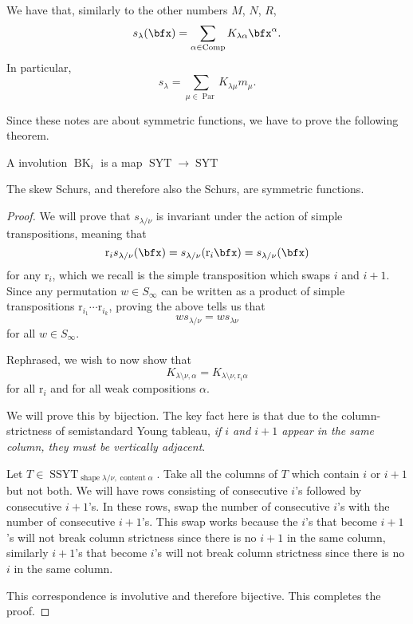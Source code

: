 \documentclass{article}
\DeclareMathOperator{\shape}{shape}
\DeclareMathOperator{\content}{content}
\DeclareMathOperator{\Par}{Par}
\DeclareMathOperator{\Com}{Comp}
\DeclareMathOperator{\SYT}{SYT}
\DeclareMathOperator{\SSYT}{SSYT}
\newcommand*\refl{\ensuremath{\text{r}}}
\DeclareMathOperator{\BK}{BK}
\begin{document}
\begin{remark}
    We have that, similarly to the other numbers $M$, $N$, $R$,
    \[
        s_\lambda(\bfx)
        = 
        \sum_{\alpha\in\Com} K_{\lambda\alpha}\bfx^\alpha.
    \]
    In particular,
    \[
        s_\lambda
        = 
        \sum_{\mu\in\Par} 
        K_{\lambda\mu}m_\mu.
    \]
\end{remark}

Since these notes are about symmetric functions, we have to prove the following theorem.

\begin{definition}
    A  involution $\BK_i$ is a map $\SYT \to \SYT$ 
\end{definition}

\begin{theorem} The skew Schurs, and therefore also the Schurs, are symmetric functions.
\end{theorem}

\begin{proof}
    We will prove that $s_{\lambda/\nu}$ is invariant under the action of simple transpositions, meaning that
    \[
        \refl_i s_{\lambda/\nu} (\bfx)
        = 
        s_{\lambda/\nu} (\refl_i \bfx)
        =
        s_{\lambda/\nu} (\bfx)
    \]
    for any $\refl_i$, which we recall is the simple transposition which swaps $i$ and $i+1$.
    Since any permutation $w \in S_\infty$ can be written as a product of simple transpositions $\refl_{i_1}\cdots \refl_{i_k}$, proving the above tells us that 
    \[
        ws_{\lambda/\nu} 
        = 
        ws_{\lambda\nu}
    \]
    for all $w \in S_\infty$.

    Rephrased, we wish to now show that 
    \[
        K_{\lambda\setminus\nu,\alpha} 
        = 
        K_{\lambda\setminus\nu,\refl_i\alpha}
    \]
    for all $\refl_i$ and for all weak compositions $\alpha$.

    We will prove this by bijection.
    The key fact here is that due to the column-strictness of semistandard Young tableau, \textit{if $i$ and $i+1$ appear in the same column, they must be vertically adjacent}. 

    Let $T\in\SSYT_{\shape \lambda/\nu,\content \alpha}$. 
    Take all the columns of $T$ which contain $i$ or $i+1$ but not both. 
    We will have rows consisting of consecutive $i$'s followed by consecutive $i+1$'s. 
    In these rows, swap the number of consecutive $i$'s with the number of consecutive $i+1$'s. 
    This swap works because the $i$'s that become $i+1$'s will not break column strictness since there is no $i+1$ in the same column, similarly $i+1$'s that become $i$'s will not break column strictness since there is no $i$ in the same column.

    This correspondence is involutive and therefore bijective. This completes the proof.
\end{proof}
\end{document}
